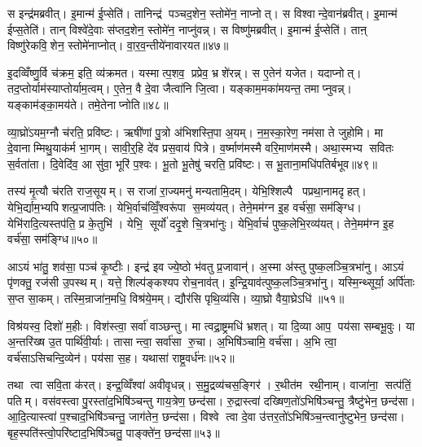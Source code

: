 स इन्द्र॑मब्रवीत्। इ॒मान्म॑ ई॒प्सेति॑। तानिन्द्र॑ पञ्चद॒शेन॒ स्तोमे॑न॒ नाप्नोत्। स विश्वान्दे॒वान॑ब्रवीत्। इ॒मान्म॑ ईप्स॒तेति॑। तान् विश्वे॑दे॒वाः स॑प्तद॒शेन॒ स्तोमे॑न॒ नाप्नु॑वन्न्। स विष्णु॑मब्रवीत्। इ॒मान्म॑ ई॒प्सेति॑। ताऩ् विष्णु॑रेकवि॒शेन॒ स्तोमे॑नाप्नोत्। वा॒र॒व॒न्तीये॑नावारयत॥४७॥

इ॒दव्विँष्णु॒र्वि च॑क्रम॒ इति॒ व्य॑क्रमत। यस्मात्प॒शव॒ प्रप्रेव॒ भ्रशे॑रन्न्। स ए॒तेन॑ यजेत। यदाप्नोत्। तद॒प्तोर्याम॑स्याप्तोर्याम॒त्वम्। ए॒तेन॒ वै दे॒वा जैत्वा॑नि जि॒त्वा। यङ्काम॒मका॑मयन्त॒ तमाप्नुवन्न्। यङ्काम॑ङ्का॒मय॑ते। तमे॒तेनाप्नोति॥४८॥\anuvakamend[स्तोमे॑न॒ नाप्नो॑दवारयत॒ नव॑ च]

व्या॒घ्रो॑ऽयम॒ग्नौ च॑रति॒ प्रवि॑ष्टः। ऋषी॑णां पु॒त्रो अ॑भिशस्ति॒पा अ॒यम्। न॒म॒स्का॒रेण॒ नम॑सा ते जुहोमि। मा दे॒वानाम्मिथु॒याक॑र्म भा॒गम्। सावी॒र्॒हि दे॑व प्रस॒वाय॑ पित्रे। व॒र्ष्माण॑मस्मै वरि॒माण॑मस्मै। अथा॒स्मभ्य सवितः स॒र्वता॑ता। दि॒वेदि॑व॒ आ सु॑वा॒ भूरि॑ प॒श्वः। भू॒तो भू॒तेषु॑ चरति॒ प्रवि॑ष्टः। स भू॒ताना॒मधि॑पतिर्बभूव॥४९॥

तस्य॑ मृ॒त्यौ च॑रति राज॒सूयम्। स राजा॑ रा॒ज्यमनु॑ मन्यतामि॒दम्। येभि॒श्शिल्पै पप्रथा॒नामदृहत्। येभि॒र्द्याम॒भ्यपिशत्प्र॒जाप॑तिः। येभि॒र्वाच॑व्विँ॒श्वरू॑पा स॒मव्य॑यत्। तेने॒मम॑ग्न इ॒ह वर्च॑सा॒ सम॑ङ्ग्धि। येभि॑रादि॒त्यस्तप॑ति॒ प्र के॒तुभि॑। येभि॒ सूर्यो॑ ददृ॒शे चि॒त्रभा॑नुः। येभि॒र्वाचं॑ पुष्क॒लेभि॒रव्य॑यत्। तेने॒मम॑ग्न इ॒ह वर्च॑सा॒ सम॑ङ्ग्धि॥५०॥

आऽयं भा॑तु॒ शव॑सा॒ पञ्च॑ कृ॒ष्टीः। इन्द्र॑ इव ज्ये॒ष्ठो भ॑वतु प्र॒जावान्॑। अ॒स्मा अ॑स्तु पुष्क॒लञ्चि॒त्रभा॑नु। आऽयं पृ॑णक्तु॒ रज॑सी उ॒पस्थम्। यत्ते॒ शिल्प॑ङ्कश्यप रोच॒नाव॑त्। इ॒न्द्रि॒याव॑त्पुष्क॒लञ्चि॒त्रभा॑नु। यस्मि॒न्थ्सूर्या॒ अर्पि॑ताः स॒प्त सा॒कम्। तस्मि॒न्राजा॑न॒मधि॒ विश्र॑ये॒मम्। द्यौर॑सि पृथि॒व्य॑सि। व्या॒घ्रो वैया॒घ्रेऽधि॑ ॥५१॥

विश्र॑यस्व॒ दिशो॑ म॒हीः। विश॑स्त्वा॒ सर्वा॑ वाञ्छन्तु। मा त्वद्रा॒ष्ट्रमधि॑ भ्रशत्। या दि॒व्या आप॒ पय॑सा सम्बभू॒वुः। या अ॒न्तरि॑ख्ष उ॒त पार्थि॑वी॒र्याः। तासान्त्वा॒ सर्वा॑सा रु॒चा। अ॒भिषि॑ञ्चामि॒ वर्च॑सा। अ॒भि त्वा॒ वर्च॑साऽसिचन्दि॒व्येन॑। पय॑सा स॒ह। यथासा॑ राष्ट्र॒वर्ध॑नः॥५२॥

तथा त्वा सवि॒ता क॑रत्। इन्द्र॒व्विँश्वा॑ अवीवृधन्न्। स॒मु॒द्रव्य॑चस॒ङ्गिर॑। र॒थीत॑म रथी॒नाम्। वाजा॑ना॒ सत्प॑तिं॒ पतिम्। वस॑वस्त्वा पु॒रस्ता॑द॒भिषि॑ञ्चन्तु गाय॒त्रेण॒ छन्द॑सा। रु॒द्रास्त्वा॑ दख्षिण॒तो॑ऽभिषि॑ञ्चन्तु॒ त्रैष्टु॑भेन॒ छन्द॑सा। आ॒दि॒त्यास्त्वा॑ प॒श्चाद॒भिषि॑ञ्चन्तु॒ जाग॑तेन॒ छन्द॑सा। विश्वे त्वा दे॒वा उ॑त्तर॒तो॑ऽभिषि॑ञ्च॒न्त्वानु॑ष्टुभेन॒ छन्द॑सा। बृह॒स्पति॑स्त्वो॒परि॑ष्टाद॒भिषि॑ञ्चतु॒ पाङ्क्ते॑न॒ छन्द॑सा॥५३॥

